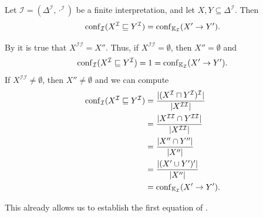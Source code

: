 \begin{Proposition}
  \label{prop:confidence-in-I-is-confidence-in-K_I}
  Let $\mathcal{I} = (\Delta^{\mathcal{I}}, \cdot^{\mathcal{I}})$ be a finite
  interpretation, and let $X, Y \subseteq \Delta^{\mathcal{I}}$.  Then
  \begin{equation*}
    \operatorname{conf}_{\mathcal{I}}(X^{\mathcal{I}} \sqsubseteq Y^{\mathcal{I}}) = \operatorname{conf}_{{\mathbb{K}}_{\mathcal{I}}}(X' \to Y').
  \end{equation*}
\end{Proposition}
\begin{Proof}
  By  it is true that $X^{\mathcal{I}\mathcal{I}} = X''$.
  Thus, if $X^{\mathcal{I}\mathcal{I}} = \emptyset$, then $X'' = \emptyset$ and
  \begin{equation*}
    \operatorname{conf}_{\mathcal{I}}(X^{\mathcal{I}} \sqsubseteq Y^{\mathcal{I}}) = 1 = \operatorname{conf}_{{\mathbb{K}}_{\mathcal{I}}}(X' \to Y').
  \end{equation*}
  If $X^{\mathcal{I}\mathcal{I}} \neq \emptyset$, then $X'' \neq \emptyset$ and we can compute
  \begin{align*}
    \operatorname{conf}_{\mathcal{I}}(X^{\mathcal{I}} \sqsubseteq Y^{\mathcal{I}})
    &= \frac{ \lvert (X^{\mathcal{I}} \sqcap Y^{\mathcal{I}})^{\mathcal{I}} \rvert }{ \lvert
        X^{\mathcal{I}\mathcal{I}} \rvert }\\
    &= \frac{ \lvert X^{\mathcal{I}\mathcal{I}} \cap Y^{\mathcal{I}\mathcal{I}} \rvert }{ \lvert
        X^{\mathcal{I}\mathcal{I}} \rvert } \\
    &= \frac{ \lvert X'' \cap Y'' \rvert }{ \lvert X'' \rvert } \\
    &= \frac{ \lvert (X' \cup Y')' \rvert }{ \lvert X'' \rvert } \\
    &= \operatorname{conf}_{{\mathbb{K}}_{\mathcal{I}}}(X' \to Y').
  \end{align*}
\end{Proof}

This already allows us to establish the first equation of .

